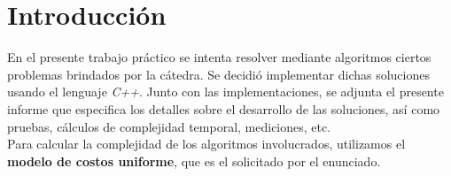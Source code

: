\section*{Introducción}

En el presente trabajo práctico se intenta resolver mediante algoritmos ciertos problemas brindados por la c\'atedra. 
Se decidi\'o implementar dichas soluciones usando el lenguaje \textit{C++}\cite{cplusplus}. Junto con las implementaciones, se adjunta el presente 
informe que especifica los detalles sobre el desarrollo de las soluciones, as\'i como pruebas, 
cálculos de complejidad temporal, mediciones, etc.\\
Para calcular la complejidad de los algoritmos involucrados, utilizamos el \textbf{modelo de costos uniforme}, que es el solicitado por el enunciado.
